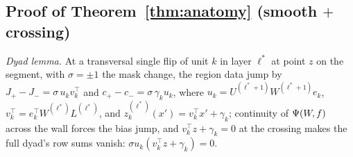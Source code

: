 \subsection{Proof of Theorem~\ref{thm:anatomy} (smooth $+$ crossing)}

\emph{Dyad lemma.} At a transversal single flip of unit $k$ in layer
$\ell^{*}$ at point $z$ on the segment, with $\sigma=\pm1$ the mask change,
the region data jump by $J_{+}-J_{-}=\sigma\,u_kv_k^{\top}$ and
$c_{+}-c_{-}=\sigma\,\gamma_ku_k$, where
$u_k=U^{(\ell^{*}+1)}W^{(\ell^{*}+1)}e_k$,
$v_k^{\top}=e_k^{\top}W^{(\ell^{*})}L^{(\ell^{*})}$, and
$z^{(\ell^{*})}_k(x')=v_k^{\top}x'+\gamma_k$; continuity of $\Psi(W\!,f)$ across the
wall forces the bias jump, and $v_k^{\top}z+\gamma_k=0$ at the crossing makes
the full dyad's row sums vanish:
$\sigma u_k(v_k^{\top}z+\gamma_k)=0$.


